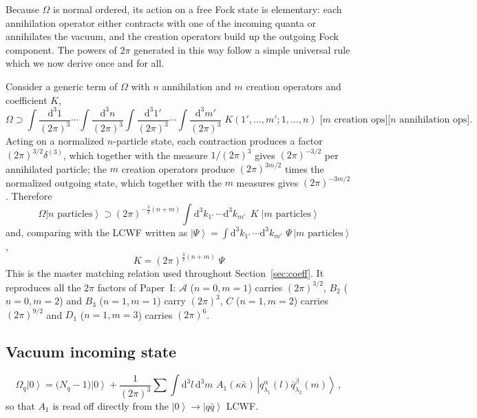 \documentclass[11pt]{article}
\newcommand{\dd}{\mathrm{d}}
\newcommand{\ip}[1]{\int\!\frac{\dd^3 #1}{(2\pi)^3}}
\newcommand{\dt}[1]{\dd^3 #1\,}
\newcommand{\ket}[1]{\left|#1\right\rangle}
\newcommand{\vac}{\ket{0}}
\newcommand{\qk}[3]{q^{#1}_{#2}(#3)}
\newcommand{\aqk}[3]{\bar q^{#1}_{#2}(#3)}
\newcommand{\OM}{\Omega}
\newcommand{\OMq}{\OM_{q}}
\begin{document}
Because $\OM$ is normal ordered, its action on a free Fock state is elementary: each annihilation
operator either contracts with one of the incoming quanta or annihilates the vacuum, and the
creation operators build up the outgoing Fock component. The powers of $2\pi$ generated in this way
follow a simple universal rule which we now derive once and for all.

Consider a generic term of $\OM$ with $n$ annihilation and $m$ creation operators and coefficient
$K$,
\begin{equation}
\OM\supset \ip{1}\!\cdots\!\ip{n}\ip{1'}\!\cdots\!\ip{m'}\;
K(1',\dots,m';1,\dots,n)\;
\big[\text{$m$ creation ops}\big]\big[\text{$n$ annihilation ops}\big].
\end{equation}
Acting on a normalized $n$-particle state, each contraction produces a factor
$(2\pi)^{3/2}\delta^{(3)}$, which together with the measure $1/(2\pi)^3$ gives $(2\pi)^{-3/2}$ per
annihilated particle; the $m$ creation operators produce $(2\pi)^{3m/2}$ times the normalized
outgoing state, which together with the $m$ measures gives $(2\pi)^{-3m/2}$. Therefore
\begin{equation}
\boxed{\;
\OM\ket{n\text{ particles}}\supset (2\pi)^{-\frac32(n+m)}\!\int\!\dt{k_{1'}}\!\cdots\dt{k_{m'}}\;
K\;\ket{m\text{ particles}}\;}
\label{eq:rule1}
\end{equation}
and, comparing with the LCWF written as
$\ket{\Psi}=\int\dt{k_{1'}}\cdots\dt{k_{m'}}\,\Psi\,\ket{m\text{ particles}}$,
\begin{equation}
\boxed{\;K=(2\pi)^{\frac32(n+m)}\;\Psi\;}
\label{eq:rule2}
\end{equation}
This is the master matching relation used throughout Section~\ref{sec:coeff}. It reproduces all the
$2\pi$ factors of Paper~I: $\mathcal A$ ($n=0,m=1$) carries $(2\pi)^{3/2}$, $B_2$ ($n=0,m=2$) and
$B_3$ ($n=1,m=1$) carry $(2\pi)^3$, $C$ ($n=1,m=2$) carries $(2\pi)^{9/2}$ and $D_1$ ($n=1,m=3$)
carries $(2\pi)^6$.

\subsection{Vacuum incoming state}
\begin{equation}
\OMq\vac=\big(N_q-1\big)\vac
+\frac{1}{(2\pi)^3}\sum\int\dt{l}\dt{m}\,A_1(\kappa\bar\kappa)\,
\ket{\qk{\alpha}{\lambda_1}{l}\aqk{\beta}{\lambda_2}{m}}\,,
\label{eq:Omvac}
\end{equation}
so that $A_1$ is read off directly from the $\vac\to\ket{q\bar q}$ LCWF.
\end{document}
